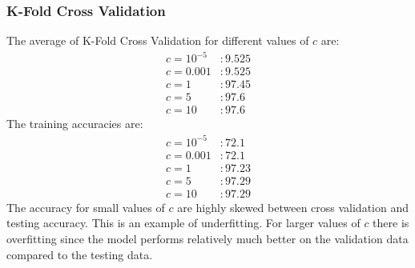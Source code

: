 \documentclass[11pt]{article}
\begin{document}
\subsubsection{K-Fold Cross Validation}
The average of K-Fold Cross Validation for different values of $c$ are:
\begin{equation}
  \begin{split}
    c = 10^{-5}&: 9.525\\
    c = 0.001&: 9.525\\
    c = 1&: 97.45\\
    c = 5&: 97.6\\
    c = 10&: 97.6
  \end{split}
\end{equation}
The training accuracies are:
\begin{equation}
  \begin{split}
    c = 10^{-5}&: 72.1\\
    c = 0.001&: 72.1\\
    c = 1&: 97.23\\
    c = 5&: 97.29\\
    c = 10&: 97.29
  \end{split}
\end{equation}
The accuracy for small values of $c$ are highly skewed between cross validation and testing accuracy. This is an example of underfitting. For larger values of $c$ there is overfitting since the model performs relatively much better on the validation data compared to the testing data.
\end{document}
